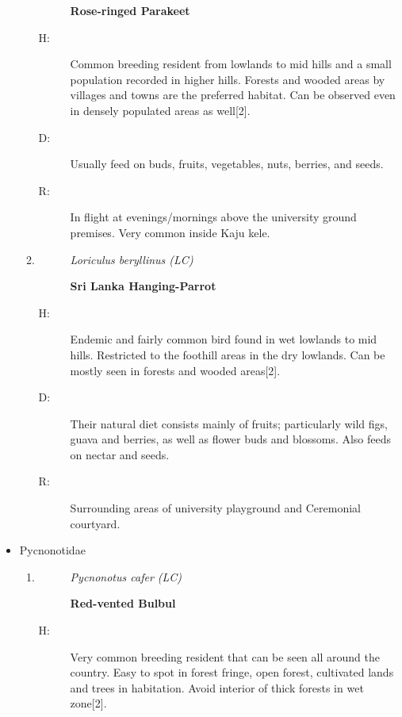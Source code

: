 \begin{itemize}
\begin{enumerate}
\begin{description}
\item[]%
\textbf{Rose{-}ringed Parakeet}%
\end{description}%
\begin{description}%
\item[H: ]%
Common breeding resident from lowlands to mid hills and a small population recorded in higher hills. Forests and wooded areas by villages and towns are the preferred habitat. Can be observed even in densely populated areas as well{[}2{]}.%
\item[D: ]%
Usually feed on buds, fruits, vegetables, nuts, berries, and seeds.%
\item[R: ]%
In flight at evenings/mornings above the university ground premises. Very common inside Kaju kele.%
\end{description}%
\item%
\begin{description}%
\item[]%
\textit{Loriculus beryllinus (LC)}%
\item[]%
\textbf{Sri Lanka Hanging{-}Parrot}%
\end{description}%
\begin{description}%
\item[H: ]%
Endemic and fairly common bird found in wet lowlands to mid hills. Restricted to the foothill areas in the dry lowlands. Can be mostly seen in forests and wooded areas{[}2{]}.%
\item[D: ]%
Their natural diet consists mainly of fruits; particularly wild figs, guava and berries, as well as flower buds and blossoms. Also feeds on nectar and seeds.%
\item[R: ]%
Surrounding areas of university playground and Ceremonial courtyard.%
\end{description}%
\end{enumerate}%
\item%
Pycnonotidae%
\begin{enumerate}%
\item%
\begin{description}%
\item[]%
\textit{Pycnonotus cafer (LC)}%
\item[]%
\textbf{Red{-}vented Bulbul}%
\end{description}%
\begin{description}%
\item[H: ]%
Very common breeding resident that can be seen all around the country. Easy to spot in forest fringe, open forest, cultivated lands and trees in habitation.  Avoid interior of thick forests in wet zone{[}2{]}.%

\end{description}
\end{enumerate}
\end{itemize}
